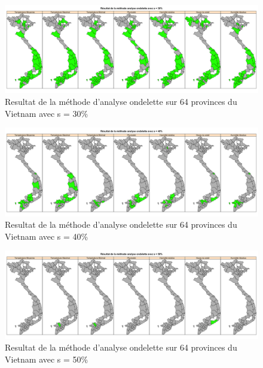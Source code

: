 \begin{figure}[h]
\includegraphics[width = \linewidth]{../figures/chap4/Pic4_7.png}
\caption{Resultat de la méthode d'analyse ondelette sur 64 provinces du Vietnam avec s = 30\%}
\label{Pic4_7}	
\end{figure}

\begin{figure}[h]
\includegraphics[width = \linewidth]{../figures/chap4/Pic4_8.png}
\caption{Resultat de la méthode d'analyse ondelette sur 64 provinces du Vietnam avec s = 40\%}
\label{Pic4_8}	
\end{figure}

\begin{figure}[h]
\includegraphics[width = \linewidth]{../figures/chap4/Pic4_9.png}
\caption{Resultat de la méthode d'analyse ondelette sur 64 provinces du Vietnam avec s = 50\%}
\label{Pic4_9}	
\end{figure}


